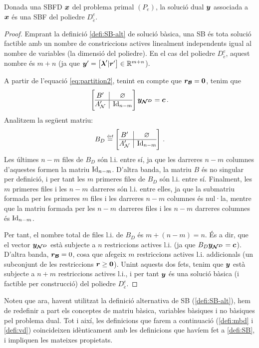 \begin{prop}\label{prop:SD-SDBF}
	Donada una SBFD $\boldsymbol{x}$ del problema primal $(P_e)$, la solució dual $\boldsymbol{y}$ associada a $\boldsymbol{x}$ és una SBF del poliedre $D^e_{\tilde{e}}$.
	\begin{proof}
		Emprant la definició \ref{defi:SB-alt} de solució bàsica, una SB és tota solució factible amb un nombre de constriccions actives linealment independents igual al nombre de variables (la dimensió del poliedre). En el cas del poliedre $D^e_{\tilde{e}}$, aquest nombre és $m+n$ (ja que $\boldsymbol{y}' = \left[\boldsymbol{\lambda}'\vert \boldsymbol{r}'\right]\in \mathbb{R}^{m+n}$).
		
		A partir de l'equació \eqref{eq:partition2}, tenint en compte que $\boldsymbol{r_{\mathcal{B}}}=\boldsymbol{0}$, tenim que
		\[
			\left[\begin{array}{{@{}c|c@{}}}
			B'	  &	\varnothing	\\
			\hline
			A_\N' & \Id_{n-m}
			\end{array}\right]
			\vb{y_{\N^D}} = \vb{c}\,.
		\]
		Analitzem la següent matriu:
		\[
			B_D \defeq \left[
			\begin{array}{@{}c|c@{}}
				B'	  &	\varnothing	\\
				\hline
				A_\N' & \Id_{n-m}
			\end{array}
			\right]\,.
		\]
		Les últimes $n-m$ files de $B_D$ són l.i. entre sí, ja que les darreres $n-m$ columnes d'aquestes formen la matriu $\operatorname{Id}_{n-m}$. D'altra banda, la matriu $B$ és no singular per definició, i per tant les $m$ primeres files de $B_D$ són l.i. entre sí. Finalment, les $m$ primeres files i les $n-m$ darreres són l.i. entre elles, ja que la submatriu formada per les primeres $m$ files i les darreres $n-m$ columnes és nul·la, mentre que la matriu formada per les $n-m$ darreres files i les $n-m$ darreres columnes és $\operatorname{Id}_{n-m}$.
		
		Per tant, el nombre total de files l.i. de $B_D$ és $m+(n-m) = n$. És a dir, que el vector $\boldsymbol{y_{\mathcal{N}^D}}$ està subjecte a $n$ restriccions actives l.i. (ja que $B_D \boldsymbol{y_{\mathcal{N}^D}} = \boldsymbol{c}$). D'altra banda, $\boldsymbol{r_{\mathcal{B}}} = 0$, cosa que afegeix $m$ restriccions actives l.i. addicionals (un subconjunt de les restriccions $\boldsymbol{r}\ge\boldsymbol{0}$). Unint aquests dos fets, tenim que $\boldsymbol{y}$ està subjecte a $n+m$ restriccions actives l.i., i per tant $\boldsymbol{y}$ és una solució bàsica (i factible per construcció) del poliedre $D^e_{\tilde{e}}$.
	\end{proof}
\end{prop}

Noteu que ara, havent utilitzat la definició alternativa de SB (\ref{defi:SB-alt}), hem de redefinir a part els conceptes de matriu bàsica, variables bàsiques i no bàsiques pel problema dual. Tot i així, les definicions que farem a continuació (\ref{defi:mbd} i \ref{defi:vd}) coincideixen idènticament amb les definicions que havíem fet a \ref{defi:SB}, i impliquen les mateixes propietats.

